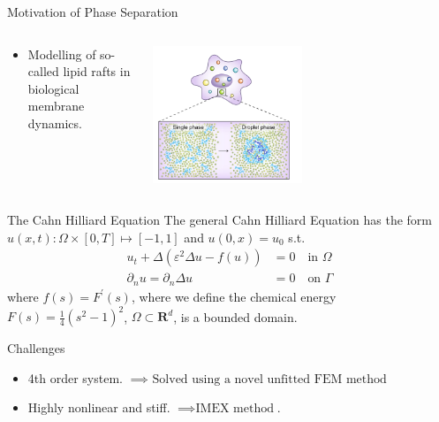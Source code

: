 \begin{frame}{Motivation of Phase Separation}
    \begin{columns}
        \begin{column}{0.5\textwidth}
            \begin{itemize}
            \item Modelling of so-called lipid rafts in biological membrane dynamics.
            \end{itemize}
        \end{column}
        \begin{column}{0.9\textwidth}
            \includegraphics[width=0.5\textwidth]{CH-example/oil2.png}
        \end{column}
    \end{columns}
\end{frame}

\begin{frame}
    \begin{block}{The Cahn Hilliard Equation}
        The general Cahn Hilliard Equation  has the form $u( x, t): \Omega \times [0,T] \mapsto [-1,1]   $ and $ u(0,x)  =u_0$  s.t.
            \[
            \begin{split}
                 u_t+\Delta\left(\varepsilon^2 \Delta u- f(u)\right)&=0 \quad \text{in } \Omega \\
\partial_n u=\partial_n \Delta u& =0 \quad \text{on } \Gamma
            \end{split}
            \]
where $f(s)=F^{\prime}(s)$, where we define the chemical energy $F(s)=\frac{1}{4}\left(s^2-1\right)^2$,  $\Omega \subset \mathbf{R}^d$, is a bounded domain.
\end{block}
\begin{block}{Challenges}
    \begin{itemize}
         \item 4th order system. $ \implies  \text{ Solved using a novel unfitted FEM method}$
        \item Highly nonlinear and stiff. $\implies \text{IMEX method} $.
    \end{itemize}
\end{block}
\end{frame}




